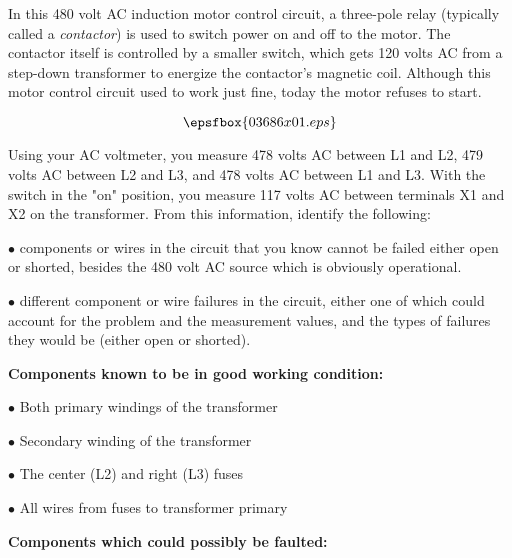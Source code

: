 

In this 480 volt AC induction motor control circuit, a three-pole relay (typically called a {\it contactor}) is used to switch power on and off to the motor.  The contactor itself is controlled by a smaller switch, which gets 120 volts AC from a step-down transformer to energize the contactor's magnetic coil.  Although this motor control circuit used to work just fine, today the motor refuses to start.

$$\epsfbox{03686x01.eps}$$

Using your AC voltmeter, you measure 478 volts AC between L1 and L2, 479 volts AC between L2 and L3, and 478 volts AC between L1 and L3.  With the switch in the "on" position, you measure 117 volts AC between terminals X1 and X2 on the transformer.  From this information, identify the following:

\vskip 10pt

\medskip
\item{$\bullet$}  components or wires in the circuit that you know cannot be failed either open or shorted, besides the 480 volt AC source which is obviously operational.
\vskip 40pt
\item{$\bullet$}  different component or wire failures in the circuit, either one of which could account for the problem and the measurement values, and the types of failures they would be (either open or shorted).
\medskip








\noindent
{\bf Components known to be in good working condition:}

\medskip
\item{$\bullet$} Both primary windings of the transformer
\item{$\bullet$} Secondary winding of the transformer
\item{$\bullet$} The center (L2) and right (L3) fuses
\item{$\bullet$} All wires from fuses to transformer primary
\medskip

\vskip 10pt

\goodbreak
\noindent
{\bf Components which could possibly be faulted:}

